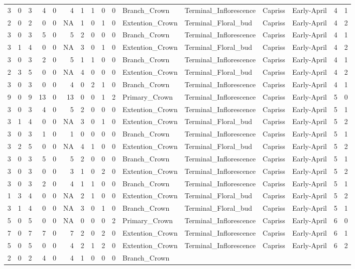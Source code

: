 \documentclass[]{article}
\begin{document}
\begin{longtable}[]{@{}rrrrrrrrrrllllrl@{}}
3 & 0 & 3 & 4 & 0 & 4 & 1 & 1 & 0 & 0 & Branch\_Crown &
Terminal\_Inflorescence & Capriss & Early-April & 4 & 1\tabularnewline
2 & 0 & 2 & 0 & 0 & NA & 1 & 0 & 1 & 0 & Extention\_Crown &
Terminal\_Floral\_bud & Capriss & Early-April & 4 & 2\tabularnewline
3 & 0 & 3 & 5 & 0 & 5 & 2 & 0 & 0 & 0 & Branch\_Crown &
Terminal\_Inflorescence & Capriss & Early-April & 4 & 1\tabularnewline
3 & 1 & 4 & 0 & 0 & NA & 3 & 0 & 1 & 0 & Extention\_Crown &
Terminal\_Floral\_bud & Capriss & Early-April & 4 & 2\tabularnewline
3 & 0 & 3 & 2 & 0 & 5 & 1 & 1 & 0 & 0 & Branch\_Crown &
Terminal\_Inflorescence & Capriss & Early-April & 4 & 1\tabularnewline
2 & 3 & 5 & 0 & 0 & NA & 4 & 0 & 0 & 0 & Extention\_Crown &
Terminal\_Floral\_bud & Capriss & Early-April & 4 & 2\tabularnewline
3 & 0 & 3 & 0 & 0 & 4 & 0 & 2 & 1 & 0 & Branch\_Crown &
Terminal\_Inflorescence & Capriss & Early-April & 4 & 1\tabularnewline
9 & 0 & 9 & 13 & 0 & 13 & 0 & 0 & 1 & 2 & Primary\_Crown &
Terminal\_Inflorescence & Capriss & Early-April & 5 & 0\tabularnewline
3 & 0 & 3 & 4 & 0 & 5 & 2 & 0 & 0 & 0 & Extention\_Crown &
Terminal\_Inflorescence & Capriss & Early-April & 5 & 1\tabularnewline
3 & 1 & 4 & 0 & 0 & NA & 3 & 0 & 1 & 0 & Extention\_Crown &
Terminal\_Floral\_bud & Capriss & Early-April & 5 & 2\tabularnewline
3 & 0 & 3 & 1 & 0 & 1 & 0 & 0 & 0 & 0 & Branch\_Crown &
Terminal\_Inflorescence & Capriss & Early-April & 5 & 1\tabularnewline
3 & 2 & 5 & 0 & 0 & NA & 4 & 1 & 0 & 0 & Extention\_Crown &
Terminal\_Floral\_bud & Capriss & Early-April & 5 & 2\tabularnewline
3 & 0 & 3 & 5 & 0 & 5 & 2 & 0 & 0 & 0 & Branch\_Crown &
Terminal\_Inflorescence & Capriss & Early-April & 5 & 1\tabularnewline
3 & 0 & 3 & 0 & 0 & 3 & 1 & 0 & 2 & 0 & Extention\_Crown &
Terminal\_Inflorescence & Capriss & Early-April & 5 & 2\tabularnewline
3 & 0 & 3 & 2 & 0 & 4 & 1 & 1 & 0 & 0 & Branch\_Crown &
Terminal\_Inflorescence & Capriss & Early-April & 5 & 1\tabularnewline
1 & 3 & 4 & 0 & 0 & NA & 2 & 1 & 0 & 0 & Extention\_Crown &
Terminal\_Floral\_bud & Capriss & Early-April & 5 & 2\tabularnewline
3 & 1 & 4 & 0 & 0 & NA & 3 & 0 & 1 & 0 & Branch\_Crown &
Terminal\_Floral\_bud & Capriss & Early-April & 5 & 1\tabularnewline
5 & 0 & 5 & 0 & 0 & NA & 0 & 0 & 0 & 2 & Primary\_Crown &
Terminal\_Inflorescence & Capriss & Early-April & 6 & 0\tabularnewline
7 & 0 & 7 & 7 & 0 & 7 & 2 & 0 & 2 & 0 & Extention\_Crown &
Terminal\_Inflorescence & Capriss & Early-April & 6 & 1\tabularnewline
5 & 0 & 5 & 0 & 0 & 4 & 2 & 1 & 2 & 0 & Extention\_Crown &
Terminal\_Inflorescence & Capriss & Early-April & 6 & 2\tabularnewline
2 & 0 & 2 & 4 & 0 & 4 & 1 & 0 & 0 & 0 & Branch\_Crown &

\end{longtable}
\end{document}

